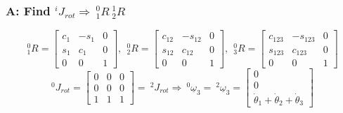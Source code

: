 \documentclass[]{article}
\begin{document}
\subsubsection{A: Find $^{i}J_{rot} \Rightarrow\ \!^{0}_{1}R\ \!^{1}_{2}R$ }
\begin{displaymath}
^{0}_{1}R = \left[ \begin{array}{ccc} c_{1} & -s_{1} & 0 \\ s_{1} & c_{1} & 0 \\ 0 & 0 & 1 \end{array} \right],\ \ ^{0}_{2}R = \left[ \begin{array}{ccc} c_{12} & -s_{12} & 0 \\ s_{12} & c_{12} & 0 \\ 0 & 0 & 1 \end{array} \right],\ \ ^{0}_{3}R = \left[ \begin{array}{ccc} c_{123} & -s_{123} & 0 \\ s_{123} & c_{123} & 0 \\ 0 & 0 & 1 \end{array} \right]
\end{displaymath}
\begin{displaymath}
^{0}J_{rot} = \left[ \begin{array}{ccc} 0 & 0 & 0 \\ 0 & 0 & 0 \\ 1 & 1 & 1 \end{array}\right] = \ \! ^{2}J_{rot} \Rightarrow \ \!^{0}\underline{\omega}_{3} = \ \! ^{2}\underline{\omega}_{3} = \left[ \begin{array}{c} 0 \\ 0 \\ \dot{\theta}_{1}+\dot{\theta}_{2}+\dot{\theta}_{3} \end{array} \right]
\end{displaymath}
\end{document}
